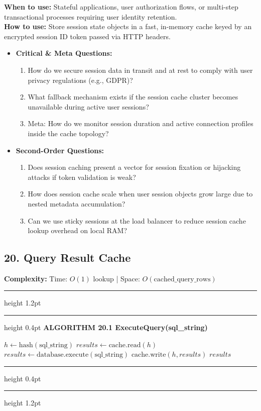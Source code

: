 \documentclass[11pt,a4paper]{article}
\newenvironment{textbookalgo}[2]{%
  \par\addvspace{1.2em}\noindent
  \hrule height 1.2pt
  \vspace{1.5pt}
  \hrule height 0.4pt
  \vspace{5pt}
  {\noindent\large\bfseries\sffamily ALGORITHM #1 \quad #2}
  \par\vspace{5pt}
  \RestyleAlgo{plain}
}{%
  \par\vspace{4pt}
  \hrule height 0.4pt
  \vspace{1.5pt}
  \hrule height 1.2pt
  \par\addvspace{1.2em}
}
\theoremstyle{definition}
\begin{document}
\noindent
\textbf{When to use:} Stateful applications, user authorization flows, or multi-step transactional processes requiring user identity retention.\\
\textbf{How to use:} Store session state objects in a fast, in-memory cache keyed by an encrypted session ID token passed via HTTP headers.
\begin{itemize}[leftmargin=*]
  \item[] \textbf{Critical \& Meta Questions:}
  \begin{enumerate}
  \item How do we secure session data in transit and at rest to comply with user privacy regulations (e.g., GDPR)?
  \item What fallback mechanism exists if the session cache cluster becomes unavailable during active user sessions?
  \item Meta: How do we monitor session duration and active connection profiles inside the cache topology?
  \end{enumerate}
  \item[] \textbf{Second-Order Questions:}
  \begin{enumerate}
  \item Does session caching present a vector for session fixation or hijacking attacks if token validation is weak?
  \item How does session cache scale when user session objects grow large due to nested metadata accumulation?
  \item Can we use sticky sessions at the load balancer to reduce session cache lookup overhead on local RAM?
  \end{enumerate}
\end{itemize}
\medskip

\clearpage
\subsection{20. Query Result Cache}

\noindent
\textbf{Complexity:} Time: $O(1)$ lookup | Space: $O(\text{cached\_query\_rows})$
\smallskip

\begin{textbookalgo}{20.1}{ExecuteQuery(sql\_string)}
\begin{algorithm}[H]
$h \leftarrow \text{hash}(\text{sql\_string})$\;
$results \leftarrow \text{cache.read}(h)$\;
$results \leftarrow \text{database.execute}(\text{sql\_string})$\;
$\text{cache.write}(h, results)$\;
\Return $results$\;
\end{algorithm}
\end{textbookalgo}
\end{document}
